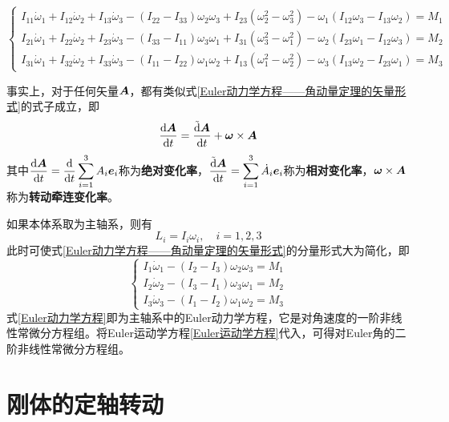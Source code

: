 \begin{equation}
\begin{cases}
	I_{11}\dot{\omega}_1+I_{12}\dot{\omega}_2+I_{13}\dot{\omega}_3-(I_{22}-I_{33})\omega_2\omega_3+I_{23}(\omega_2^2-\omega_3^2)-\omega_1(I_{12}\omega_3-I_{13}\omega_2)=M_1 \\
	I_{21}\dot{\omega}_1+I_{22}\dot{\omega}_2+I_{23}\dot{\omega}_3-(I_{33}-I_{11})\omega_3\omega_1+I_{31}(\omega_3^2-\omega_1^2)-\omega_2(I_{23}\omega_1-I_{12}\omega_3)=M_2 \\
	I_{31}\dot{\omega}_1+I_{32}\dot{\omega}_2+I_{33}\dot{\omega}_3-(I_{11}-I_{22})\omega_1\omega_2+I_{13}(\omega_1^2-\omega_2^2)-\omega_3(I_{13}\omega_2-I_{23}\omega_1)=M_3
\end{cases}
\label{Euler动力学方程——角动量定理的分量形式}
\end{equation}

事实上，对于任何矢量$\boldsymbol{A}$，都有类似式\eqref{Euler动力学方程——角动量定理的矢量形式}的式子成立，即
\begin{equation}
	\frac{\mathrm{d} \boldsymbol{A}}{\mathrm{d} t} = \frac{\tilde{\mathrm{d}} \boldsymbol{A}}{\mathrm{d} t} + \boldsymbol{\omega} \times \boldsymbol{A}
	\label{chapter6:相对变化率和绝对变化率之间的关系}
\end{equation}
其中$\displaystyle \dfrac{\mathrm{d} \boldsymbol{A}}{\mathrm{d} t} = \dfrac{\mathrm{d}}{\mathrm{d} t}\sum_{i=1}^3A_i\boldsymbol{e}_i$称为{\bf 绝对变化率}，$\displaystyle \frac{\tilde{\mathrm{d}} \boldsymbol{A}}{\mathrm{d} t} = \sum_{i=1}^3 \dot{A}_i \boldsymbol{e}_i$称为{\bf 相对变化率}，$\boldsymbol{\omega} \times \boldsymbol{A}$称为{\bf 转动牵连变化率}。

如果本体系取为主轴系，则有
\begin{equation*}
	L_i = I_i \omega_i,\quad i = 1,2,3
\end{equation*}
此时可使式\eqref{Euler动力学方程——角动量定理的矢量形式}的分量形式大为简化，即
\begin{equation}
\begin{cases}
	I_1 \dot{\omega}_1 - (I_2-I_3)\omega_2 \omega_3 = M_1\\
	I_2 \dot{\omega}_2 - (I_3-I_1)\omega_3 \omega_1 = M_2\\
	I_3 \dot{\omega}_3 - (I_1-I_2)\omega_1 \omega_2 = M_3
\end{cases}
\label{Euler动力学方程}
\end{equation}
式\eqref{Euler动力学方程}即为主轴系中的{\heiti Euler动力学方程}，它是对角速度的一阶非线性常微分方程组。将Euler运动学方程\eqref{Euler运动学方程}代入，可得对Euler角的二阶非线性常微分方程组。

\section{刚体的定轴转动}

